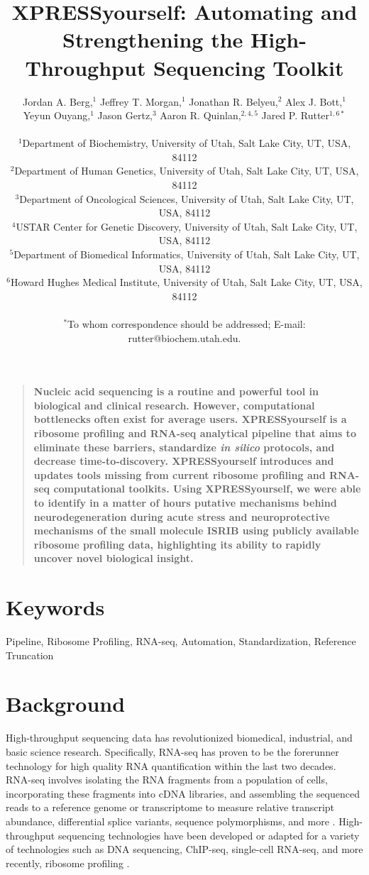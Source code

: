 \documentclass[11pt, a4paper, oneside]{article}
\title{
XPRESSyourself: Automating and Strengthening the High-Throughput Sequencing Toolkit
}
\author{
Jordan A. Berg,$^{1}$ Jeffrey T. Morgan,$^{1}$ Jonathan R. Belyeu,$^{2}$ Alex J. Bott,$^{1}$\\
Yeyun Ouyang,$^{1}$ Jason Gertz,$^{3}$ Aaron R. Quinlan,$^{2,4,5}$ Jared P. Rutter$^{1,6\ast}$\\
\\
\normalsize{$^{1}$Department of Biochemistry, University of Utah, Salt Lake City, UT, USA, 84112}\\
\normalsize{$^{2}$Department of Human Genetics, University of Utah, Salt Lake City, UT, USA, 84112}\\
\normalsize{$^{3}$Department of Oncological Sciences, University of Utah, Salt Lake City, UT, USA, 84112}\\
\normalsize{$^{4}$USTAR Center for Genetic Discovery, University of Utah, Salt Lake City, UT, USA, 84112}\\
\normalsize{$^{5}$Department of Biomedical Informatics, University of Utah, Salt Lake City, UT, USA, 84112}\\
\normalsize{$^{6}$Howard Hughes Medical Institute, University of Utah, Salt Lake City, UT, USA, 84112}\\
\\
\normalsize{$^\ast$To whom correspondence should be addressed; E-mail: rutter@biochem.utah.edu.}
}
\date{}
\newenvironment{sciabstract}{%
\begin{quote} \bf}
{\end{quote}}
\begin{document}
\baselineskip24pt

\maketitle



\begin{sciabstract}
Nucleic acid sequencing is a routine and powerful tool in biological and clinical research. However, computational bottlenecks often exist for average users. XPRESSyourself is a ribosome profiling and RNA-seq analytical pipeline that aims to eliminate these barriers, standardize \textit{in silico} protocols, and decrease time-to-discovery. XPRESSyourself introduces and updates tools missing from current ribosome profiling and RNA-seq computational toolkits. Using XPRESSyourself, we were able to identify in a matter of hours putative mechanisms behind neurodegeneration during acute stress and neuroprotective mechanisms of the small molecule ISRIB using publicly available ribosome profiling data, highlighting its ability to rapidly uncover novel biological insight.
\end{sciabstract}

\section*{Keywords}
Pipeline, Ribosome Profiling, RNA-seq, Automation, Standardization, Reference Truncation

\section{Background}
High-throughput sequencing data has revolutionized biomedical, industrial, and basic science research. Specifically, RNA-seq has proven to be the forerunner technology for high quality RNA quantification within the last two decades. RNA-seq involves isolating the RNA fragments from a population of cells, incorporating these fragments into cDNA libraries, and assembling the sequenced reads to a reference genome or transcriptome to measure relative transcript abundance, differential splice variants, sequence polymorphisms, and more \cite{byron_nrg}. High-throughput sequencing technologies have been developed or adapted for a variety of technologies such as DNA sequencing, ChIP-seq, single-cell RNA-seq, and more recently, ribosome profiling \cite{ingolia_science}. \par
\end{document}
